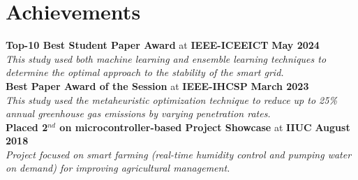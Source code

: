 \documentclass[a4paper,11pt]{article}
\begin{document}



\section{Achievements} \vspace{1mm}
\textbf{Top-10 Best Student Paper Award} at \textbf{IEEE-ICEEICT} \hfill \textbf{May 2024} \\[2pt]
    \textit{This study used both machine learning and ensemble learning techniques to determine the optimal approach to the stability of the smart grid.} \\[3pt] %
\textbf{Best Paper Award of the Session} at \textbf{IEEE-IHCSP} \hfill \textbf{March 2023} \\[2pt]
    \textit{This study used the metaheuristic optimization technique to reduce up to 25\% annual greenhouse gas emissions by varying penetration rates.} \\[3pt] %
\textbf{Placed 2$^{nd}$ on microcontroller-based Project Showcase} at \textbf{IIUC} \hfill \textbf{August 2018} \\[2pt]
    \textit{Project focused on smart farming (real-time humidity control and pumping water on demand) for improving agricultural management.}



 
 


\end{document}
